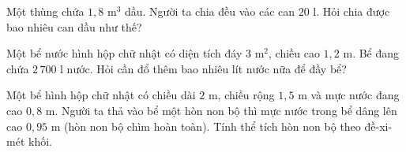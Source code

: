 \begin{ex} %
Một thùng chứa $1{,}8\text{ m}^3$ dầu. Người ta chia đều vào các can $20\text{ l}$. Hỏi chia được bao nhiêu can dầu như thế?
\end{ex}

\begin{ex} %
Một bể nước hình hộp chữ nhật có diện tích đáy $3\text{ m}^2$, chiều cao $1{,}2\text{ m}$. Bể đang chứa $2\,700\text{ l}$ nước. Hỏi cần đổ thêm bao nhiêu lít nước nữa để đầy bể?
\end{ex}

\begin{ex} %
Một bể hình hộp chữ nhật có chiều dài $2\text{ m}$, chiều rộng $1{,}5\text{ m}$ và mực nước đang cao $0{,}8\text{ m}$. Người ta thả vào bể một hòn non bộ thì mực nước trong bể dâng lên cao $0{,}95\text{ m}$ (hòn non bộ chìm hoàn toàn). Tính thể tích hòn non bộ theo đề-xi-mét khối.
\end{ex}
